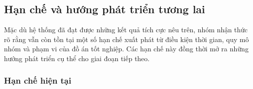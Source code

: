\subsection{Hạn chế và hướng phát triển tương lai}

\indent \indent Mặc dù hệ thống đã đạt được những kết quả tích cực nêu trên, nhóm nhận thức
rõ rằng vẫn còn tồn tại một số hạn chế xuất phát từ điều kiện thời gian,
quy mô nhóm và phạm vi của đồ án tốt nghiệp. Các hạn chế này đồng thời mở
ra những hướng phát triển cụ thể cho giai đoạn tiếp theo.

\subsubsection*{Hạn chế hiện tại}

